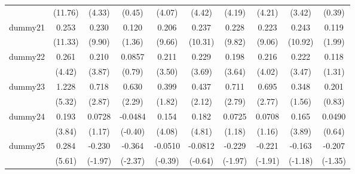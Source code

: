 {\begin{tabular}{l*{9}{c}}
            &     (11.76)         &      (4.33)         &      (0.45)         &      (4.07)         &      (4.42)         &      (4.19)         &      (4.21)         &      (3.42)         &      (0.39)         \\
[1em]
dummy21     &       0.253\sym{***}&       0.230\sym{***}&       0.120         &       0.206\sym{***}&       0.237\sym{***}&       0.228\sym{***}&       0.223\sym{***}&       0.243\sym{***}&       0.119\sym{*}  \\
            &     (11.33)         &      (9.90)         &      (1.36)         &      (9.66)         &     (10.31)         &      (9.82)         &      (9.06)         &     (10.92)         &      (1.99)         \\
[1em]
dummy22     &       0.261\sym{***}&       0.210\sym{***}&      0.0857         &       0.211\sym{***}&       0.229\sym{***}&       0.198\sym{***}&       0.216\sym{***}&       0.222\sym{***}&       0.118         \\
            &      (4.42)         &      (3.87)         &      (0.79)         &      (3.50)         &      (3.69)         &      (3.64)         &      (4.02)         &      (3.47)         &      (1.31)         \\
[1em]
dummy23     &       1.228\sym{***}&       0.718\sym{**} &       0.630\sym{*}  &       0.399         &       0.437\sym{*}  &       0.711\sym{**} &       0.695\sym{**} &       0.348         &       0.201         \\
            &      (5.32)         &      (2.87)         &      (2.29)         &      (1.82)         &      (2.12)         &      (2.79)         &      (2.77)         &      (1.56)         &      (0.83)         \\
[1em]
dummy24     &       0.193\sym{***}&      0.0728         &     -0.0484         &       0.154\sym{***}&       0.182\sym{***}&      0.0725         &      0.0708         &       0.165\sym{***}&      0.0490         \\
            &      (3.84)         &      (1.17)         &     (-0.40)         &      (4.08)         &      (4.81)         &      (1.18)         &      (1.16)         &      (3.89)         &      (0.64)         \\
[1em]
dummy25     &       0.284\sym{***}&      -0.230\sym{*}  &      -0.364\sym{*}  &     -0.0510         &     -0.0812         &      -0.229\sym{*}  &      -0.221         &      -0.163         &      -0.207         \\
            &      (5.61)         &     (-1.97)         &     (-2.37)         &     (-0.39)         &     (-0.64)         &     (-1.97)         &     (-1.91)         &     (-1.18)         &     (-1.35)         \\

\end{tabular}}
